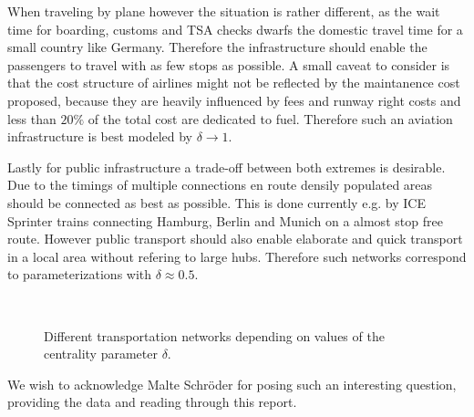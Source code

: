 \documentclass[aps,pra,showpacs,preprintnumbers,amsmath,amssymb,footinbib]{revtex4-2}
\begin{document}
    When traveling by plane however the situation is rather different, as the wait time for boarding, customs and TSA checks dwarfs the domestic travel time for a small country like Germany. 
    Therefore the infrastructure should enable the passengers to travel with as few stops as possible.
    A small caveat to consider is that the cost structure of airlines might not be reflected by the maintanence cost proposed, because they are heavily influenced by fees and runway right costs and less than $20\%$ \cite{statista.kerosin} of the total cost are dedicated to fuel.  
    Therefore such an aviation infrastructure is best modeled by $\delta \rightarrow 1$.

    Lastly for public infrastructure a trade-off between both extremes is desirable. 
    Due to the timings of multiple connections en route densily populated areas should be connected as best as possible.
    This is done currently e.g. by ICE Sprinter trains connecting Hamburg, Berlin and Munich on a almost stop free route.
    However public transport should also enable elaborate and quick transport in a local area without refering to large hubs.
    Therefore such networks correspond to parameterizations with $\delta \approx 0.5$.

    \begin{figure}[H]
        \centering
        \\
        \caption{Different transportation networks depending on values of the centrality parameter $\delta$.}
        \label{fig:results}
    \end{figure}


    \begin{acknowledgments}
        We wish to acknowledge Malte Schröder for posing such an interesting question, providing the data and reading through this report. 
    \end{acknowledgments}
\end{document}
